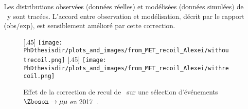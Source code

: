 Les distributions observées (données réelles) et modélisées (données simulées) de \MET\ y sont tracées.
L'accord entre observation et modélisation, décrit par le rapport (obs/exp), est sensiblement amélioré par cette correction.
\begin{figure}[h]
\centering

[.45\textwidth]
{\texttt{[image: \\PhDthesisdir/plots\_and\_images/from\_MET\_recoil\_Alexei/withoutrecoil.png]}}
\hfill
{}[.45\textwidth]
{\texttt{[image: \\PhDthesisdir/plots\_and\_images/from\_MET\_recoil\_Alexei/withrecoil.png]}}

\caption[Effet de la correction de recul de \MET.]{Effet de la correction de recul de \MET\ sur une sélection d'événements $\Zboson\to\mu\mu$ en 2017~\cite{MET_recoil_Alexei}.}
\label{fig-MET_recoil_Alexei}
\end{figure}